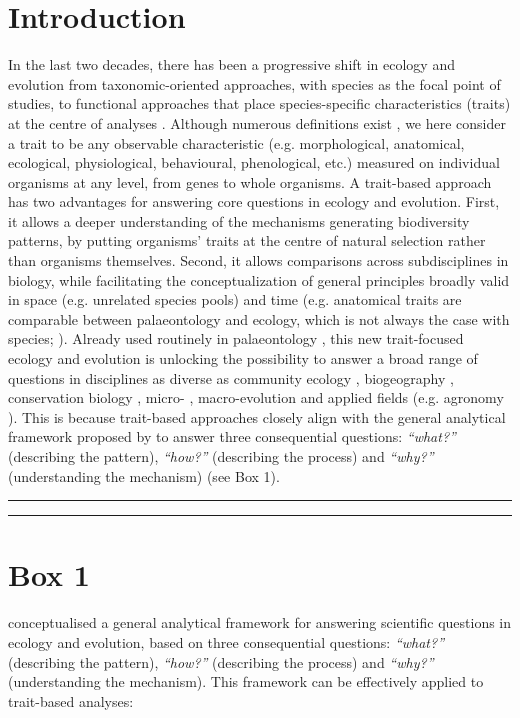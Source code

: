 \documentclass[12pt,letterpaper]{article}
\begin{document}
\newpage

\section{Introduction}

In the last two decades, there has been a progressive shift in ecology and evolution from  taxonomic-oriented approaches, with species as the focal point of studies, to functional approaches that place species-specific characteristics (traits) at the centre of analyses \citep{mammola2021concepts, palacio2022protocol}.
Although numerous definitions exist \citep{dawson2021traits}, we here consider a trait to be any observable characteristic (e.g. morphological, anatomical, ecological, physiological, behavioural, phenological, etc.) measured on individual organisms at any level, from genes to whole organisms.
A trait-based approach has two advantages for answering core questions in ecology and evolution.
First, it allows a deeper understanding of the mechanisms generating biodiversity patterns, by putting organisms' traits at the centre of natural selection rather than organisms themselves.
Second, it allows comparisons across subdisciplines in biology, while facilitating the conceptualization of general principles broadly valid in space (e.g. unrelated species pools) and time (e.g. anatomical traits are comparable between palaeontology and ecology, which is not always the case with species; \citealt{luza2023going}).
Already used routinely in palaeontology \citep{raup1961geometry, gould1991disparity, foote1995morphological, guillerme2020disparities}, this new trait-focused ecology and evolution is unlocking the possibility to answer a broad range of questions in disciplines as diverse as community ecology \citep{mcgill2006rebuilding}, biogeography \citep{violle2014emergence}, conservation biology \citep{chichorro2022trait}, micro- \citep{chapin1993evolution}, macro-evolution \citep{guillerme2023innovation} and applied fields (e.g. agronomy \citealt{martin2015plant}).
This is because trait-based approaches closely align with the general analytical framework proposed by \cite{anand1994pattern} to answer three consequential questions: \textit{``what?''} (describing the pattern), \textit{``how?''} (describing the process) and \textit{``why?''} (understanding the mechanism) (see Box 1).

\bigskip
\bigskip
\hrule
\hrule

\section*{Box 1}
\cite{anand1994pattern} conceptualised a general analytical framework for answering scientific questions in ecology and evolution, based on three consequential questions: \textit{``what?''} (describing the pattern), \textit{``how?''} (describing the process) and \textit{``why?''} (understanding the mechanism).
This framework can be effectively applied to trait-based analyses:
\end{document}
